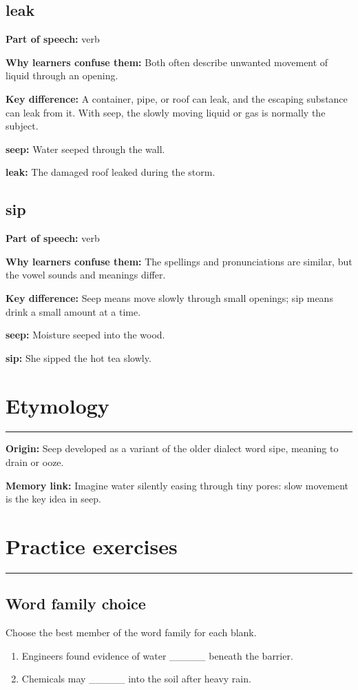 \documentclass[11pt]{article}
\newcommand{\sectionrule}{\par\vspace{-0.5em}\noindent\textcolor{Accent}{\rule{\linewidth}{0.6pt}}\par}
\begin{document}
\subsection{leak}
\textbf{Part of speech:} verb

\textbf{Why learners confuse them:} Both often describe unwanted movement of liquid through an opening.

\textbf{Key difference:} A container, pipe, or roof can leak, and the escaping substance can leak from it. With seep, the slowly moving liquid or gas is normally the subject.

\textbf{seep:} Water seeped through the wall.

\textbf{leak:} The damaged roof leaked during the storm.

\subsection{sip}
\textbf{Part of speech:} verb

\textbf{Why learners confuse them:} The spellings and pronunciations are similar, but the vowel sounds and meanings differ.

\textbf{Key difference:} Seep means move slowly through small openings; sip means drink a small amount at a time.

\textbf{seep:} Moisture seeped into the wood.

\textbf{sip:} She sipped the hot tea slowly.

\section{Etymology}
\sectionrule
\textbf{Origin:} Seep developed as a variant of the older dialect word sipe, meaning to drain or ooze.

\textbf{Memory link:} Imagine water silently easing through tiny pores: slow movement is the key idea in seep.

\section{Practice exercises}
\sectionrule
\subsection{Word family choice}
Choose the best member of the word family for each blank.

\begin{enumerate}
  \item Engineers found evidence of water \_\_\_\_\_ beneath the barrier.
  \item Chemicals may \_\_\_\_\_ into the soil after heavy rain.
\end{enumerate}
\end{document}
